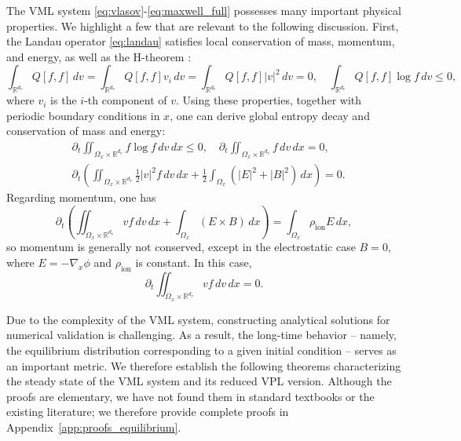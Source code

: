 \documentclass[]{article}
\newcommand{\R}{\mathbb{R}}
\numberwithin{equation}{section}
\begin{document}
The VML system \eqref{eq:vlasov}-\eqref{eq:maxwell_full} possesses many important physical properties. We highlight a few that are relevant to the following discussion. First, the Landau operator \eqref{eq:landau} satisfies local conservation of mass, momentum, and energy, as well as the H-theorem \cite{villani2002review}:
\begin{equation}
\label{eq:original_Landau}
\int_{\R^{d_v}} Q[f,f]\,dv=\int_{\R^{d_v}} Q[f,f]v_i\,dv=\int_{\R^{d_v}} Q[f,f]|v|^2\,dv=0, \quad \int_{\R^{d_v}} Q[f,f]\log f\,dv\leq 0,
\end{equation}
where $v_i$ is the $i$-th component of $v$.
Using these properties, together with periodic boundary conditions in $x$, one can derive global entropy decay and conservation of mass and energy:
\begin{align}
\label{eq:H-theorem}
&\partial_t \iint_{\Omega_x\times \R^{d_v}} f\log f\,dv\,dx\leq 0, \quad \partial_t\iint_{\Omega_x\times \R^{d_v}} f\,dv\,dx=0, \\
\label{eq:energy-consv}
& \partial_t \left(\iint_{\Omega_x\times \R^{d_v}} \frac{1}{2}|v|^2f \,dv\,dx+\frac{1}{2}\int_{\Omega_x}(|E|^2+|B|^2)\,dx\right)=0.
\end{align}
Regarding momentum, one has
\begin{equation}
\partial_t \left( \iint_{\Omega_x\times \R^{d_v}} vf\,dv\,dx+\int_{\Omega_x} (E\times B)\,dx\right)=\int_{\Omega_x} \rho_{\text{ion}}E\,dx,
\end{equation}
so momentum is generally not conserved, except in the electrostatic case $B=0$, where $E=-\nabla_x\phi$ and $\rho_{\text{ion}}$ is constant. In this case, 
\begin{equation}
\label{eq:moment-consv}
\partial_t  \iint_{\Omega_x\times \R^{d_v}} vf\,dv\,dx=0.
\end{equation}

Due to the complexity of the VML system, constructing analytical solutions for numerical validation is challenging. As a result, the long-time behavior -- namely, the equilibrium distribution corresponding to a given initial condition -- serves as an important metric. We therefore establish the following theorems characterizing the steady state of the VML system and its reduced VPL version. Although the proofs are elementary, we have not found them in standard textbooks or the existing literature; we therefore provide complete proofs in  Appendix~\ref{app:proofs_equilibrium}.
\end{document}
